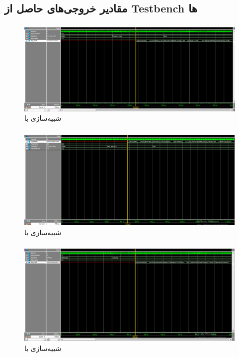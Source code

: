 \subsection{مقادیر خروجی‌های حاصل از Testbench ها}

\subsubsection{}
\begin{figure}[H]
\includegraphics[width = \textwidth]{figs/simulation/1.png}
\caption{شبیه‌سازی با }
\label{simulation_1}
\end{figure}

\subsubsection{}
\begin{figure}[H]
\includegraphics[width = \textwidth]{figs/simulation/2.png}
\caption{شبیه‌سازی با }
\label{simulation_2}
\end{figure}

\subsubsection{}
\begin{figure}[H]
\includegraphics[width = \textwidth]{figs/simulation/3.png}
\caption{شبیه‌سازی با }
\label{simulation_3}
\end{figure}

